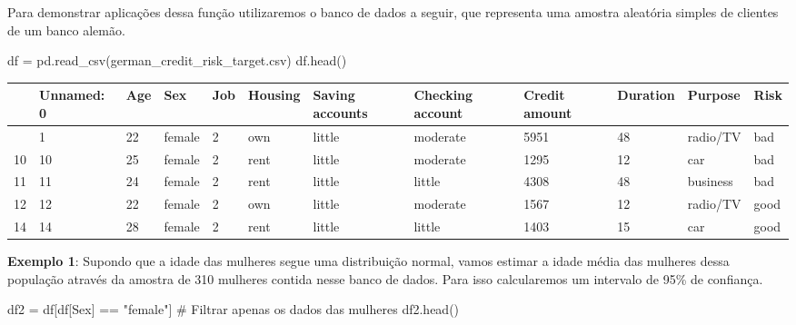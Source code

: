 \documentclass[
  letterpaper,
  DIV=11,
  numbers=noendperiod]{scrreprt}
\newenvironment{Shaded}{\begin{snugshade}}{\end{snugshade}}
\newcommand{\CommentTok}[1]{\textcolor[rgb]{0.37,0.37,0.37}{#1}}
\newcommand{\NormalTok}[1]{\textcolor[rgb]{0.00,0.23,0.31}{#1}}
\newcommand{\OperatorTok}[1]{\textcolor[rgb]{0.37,0.37,0.37}{#1}}
\newcommand{\StringTok}[1]{\textcolor[rgb]{0.13,0.47,0.30}{#1}}
\begin{document}
Para demonstrar aplicações dessa função utilizaremos o banco de dados a
seguir, que representa uma amostra aleatória simples de clientes de um
banco alemão.

\begin{Shaded}
\begin{Highlighting}[]
\NormalTok{df }\OperatorTok{=}\NormalTok{ pd.read\_csv(}\StringTok{\textquotesingle{}german\_credit\_risk\_target.csv\textquotesingle{}}\NormalTok{)}
\NormalTok{df.head()}
\end{Highlighting}
\end{Shaded}

\begin{longtable}[]{@{}llllllllllll@{}}
\toprule\noalign{}
& Unnamed: 0 & Age & Sex & Job & Housing & Saving accounts & Checking
account & Credit amount & Duration & Purpose & Risk \\
\midrule\noalign{}
\endhead
\bottomrule\noalign{}
\endlastfoot
1 & 1 & 22 & female & 2 & own & little & moderate & 5951 & 48 & radio/TV
& bad \\
10 & 10 & 25 & female & 2 & rent & little & moderate & 1295 & 12 & car &
bad \\
11 & 11 & 24 & female & 2 & rent & little & little & 4308 & 48 &
business & bad \\
12 & 12 & 22 & female & 2 & own & little & moderate & 1567 & 12 &
radio/TV & good \\
14 & 14 & 28 & female & 2 & rent & little & little & 1403 & 15 & car &
good \\
\end{longtable}

\textbf{Exemplo 1}: Supondo que a idade das mulheres segue uma
distribuição normal, vamos estimar a idade média das mulheres dessa
população através da amostra de 310 mulheres contida nesse banco de
dados. Para isso calcularemos um intervalo de 95\% de confiança.

\begin{Shaded}
\begin{Highlighting}[]
\NormalTok{df2 }\OperatorTok{=}\NormalTok{ df[df[}\StringTok{\textquotesingle{}Sex\textquotesingle{}}\NormalTok{] }\OperatorTok{==} \StringTok{"female"}\NormalTok{] }\CommentTok{\# Filtrar apenas os dados das mulheres}
\NormalTok{df2.head()}
\end{Highlighting}
\end{Shaded}
\end{document}
